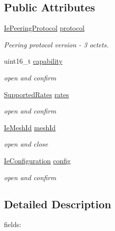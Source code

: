 \subsection*{Public Attributes}
\begin{DoxyCompactItemize}
\item 
\hyperlink{classns3_1_1dot11s_1_1IePeeringProtocol}{Ie\+Peering\+Protocol} \hyperlink{structns3_1_1dot11s_1_1PeerLinkOpenStart_1_1PlinkOpenStartFields_aa5b3188872e8c86de8ac0355a63834ee}{protocol}
\begin{DoxyCompactList}\small\item\em Peering protocol version -\/ 3 octets. \end{DoxyCompactList}\item 
uint16\+\_\+t \hyperlink{structns3_1_1dot11s_1_1PeerLinkOpenStart_1_1PlinkOpenStartFields_ac2bf0a8c58738c6a9442b9682aff924f}{capability}
\begin{DoxyCompactList}\small\item\em open and confirm \end{DoxyCompactList}\item 
\hyperlink{classns3_1_1SupportedRates}{Supported\+Rates} \hyperlink{structns3_1_1dot11s_1_1PeerLinkOpenStart_1_1PlinkOpenStartFields_a42c2f245c2734f9f39132d7ac2eb9fc9}{rates}
\begin{DoxyCompactList}\small\item\em open and confirm \end{DoxyCompactList}\item 
\hyperlink{classns3_1_1dot11s_1_1IeMeshId}{Ie\+Mesh\+Id} \hyperlink{structns3_1_1dot11s_1_1PeerLinkOpenStart_1_1PlinkOpenStartFields_a616a9e7b3649bb9bf2ea703fc701106c}{mesh\+Id}
\begin{DoxyCompactList}\small\item\em open and close \end{DoxyCompactList}\item 
\hyperlink{classns3_1_1dot11s_1_1IeConfiguration}{Ie\+Configuration} \hyperlink{structns3_1_1dot11s_1_1PeerLinkOpenStart_1_1PlinkOpenStartFields_a1a13a4a33d5206b9703e264fee628c50}{config}
\begin{DoxyCompactList}\small\item\em open and confirm \end{DoxyCompactList}\end{DoxyCompactItemize}


\subsection{Detailed Description}
fields\+: 

